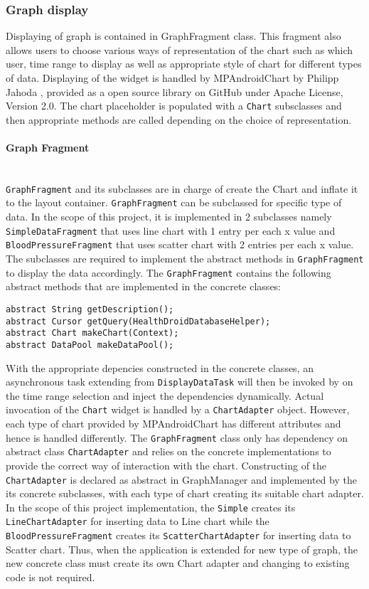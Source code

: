 \subsubsection{Graph display}
Displaying of graph is contained in GraphFragment class. This fragment also allows users to choose various ways of
representation of the chart such as which user, time range to display as well as appropriate style of chart for
different types of data. Displaying of the widget is handled by MPAndroidChart by Philipp Jahoda \cite{MPAndroidChart},
provided as a open source library on GitHub under Apache License, Version 2.0. The chart placeholder is populated with a
\texttt{Chart} subsclasses and then appropriate methods are called depending on the choice of representation.

\paragraph{Graph Fragment}\mbox{} \\
\texttt{GraphFragment} and its subclasses are in charge of create the Chart and inflate it to the layout container.
\texttt{GraphFragment} can be subclassed for specific type of data. In the scope of this project, it is implemented in 2
subclasses namely \texttt{SimpleDataFragment} that uses line chart with 1 entry per each x value and
\texttt{BloodPressureFragment} that uses scatter chart with 2 entries per each x value. The subclasses are required to
implement the abstract methods in \texttt{GraphFragment} to display the data accordingly.  The \texttt{GraphFragment}
contains the following abstract methods that are implemented in the concrete classes:

\begin{lstlisting}
abstract String getDescription();
abstract Cursor getQuery(HealthDroidDatabaseHelper);
abstract Chart makeChart(Context);
abstract DataPool makeDataPool();
\end{lstlisting}

With the appropriate depencies constructed in the concrete classes, an asynchronous task extending from
\texttt{DisplayDataTask} will then be invoked by on the time range selection and inject the dependencies dynamically.
Actual invocation of the \texttt{Chart} widget is handled by a \texttt{ChartAdapter} object. However, each type of
chart provided by MPAndroidChart has different attributes and hence is handled differently. The \texttt{GraphFragment}
class only has dependency on abstract class \texttt{ChartAdapter} and relies on the concrete implementations to provide
the correct way of interaction with the chart. Constructing of the \texttt{ChartAdapter} is declared as abstract in
GraphManager and implemented by the its concrete subclasses, with each type of chart creating its suitable chart
adapter. In the scope of this project implementation, the \texttt{Simple} creates its \texttt{LineChartAdapter} for
inserting data to Line chart while the \texttt{BloodPressureFragment} creates its \texttt{ScatterChartAdapter} for
inserting data to Scatter chart. Thus, when the application is extended for new type of graph, the new concrete class
must create its own Chart adapter and changing to existing code is not required.

